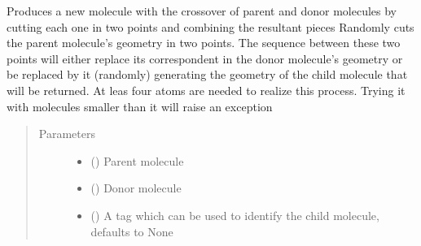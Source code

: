 \documentclass[letterpaper,10pt,english]{sphinxmanual}
\begin{document}

\begin{fulllineitems}
\label{\detokenize{molecular:molecular.crossover_2}}
\sphinxAtStartPar
Produces a new molecule with the crossover of parent and donor molecules by cutting each one in two points and
combining the resultant pieces
Randomly cuts the parent molecule’s geometry in two points. The sequence between these two points will either
replace its correspondent in the donor molecule’s geometry or be replaced by it (randomly) generating the geometry
of the child molecule that will be returned. At leas four atoms are needed to realize this process. Trying it with
molecules smaller than it will raise an exception
\begin{quote}\begin{description}
\item[{Parameters}] \leavevmode\begin{itemize}
\item {} 
\sphinxAtStartPar
{} ({\hyperref[\detokenize{molecular:molecular.Molecule}]{}}) \textendash{} Parent molecule

\item {} 
\sphinxAtStartPar
{} ({\hyperref[\detokenize{molecular:molecular.Molecule}]{}}) \textendash{} Donor molecule

\item {} 
\sphinxAtStartPar
{} (\sphinxstyleliteralemphasis{\sphinxupquote{, }}) \textendash{} A tag which can be used to identify the child molecule, defaults to None


\end{itemize}
\end{description}
\end{quote}
\end{fulllineitems}
\end{document}
